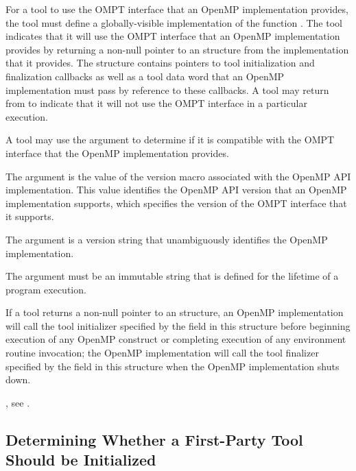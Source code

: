 \descr
For a tool to use the OMPT interface that an OpenMP implementation provides,
the tool must define a globally-visible implementation of the
function . The tool indicates that it will use the OMPT 
interface that an OpenMP implementation provides by returning a non-null 
pointer to an  structure from the 
 implementation that it provides. The 
 structure contains pointers to tool 
initialization and finalization callbacks as well as a tool data word 
that an OpenMP implementation must pass by reference to these callbacks. 
A tool may return  from  to indicate 
that it will not use the OMPT interface in a particular execution.

A tool may use the  argument to determine if it is 
compatible with the OMPT interface that the OpenMP implementation provides.

\argdesc
The argument  is the value of the  version macro
associated with the OpenMP API implementation. This value identifies the OpenMP 
API version that an OpenMP implementation supports, which specifies the version 
of the OMPT interface that it supports.

The argument  is a version string that unambiguously 
identifies the OpenMP implementation.

\constraints
The argument  must be an immutable string that is defined 
for the lifetime of a program execution.

\effect
If a tool returns a non-null pointer to an  
structure, an OpenMP implementation will call the tool initializer specified 
by the  field in this structure before beginning execution 
of any OpenMP construct or completing execution of any environment routine 
invocation; the OpenMP implementation will call the tool finalizer specified 
by the  field in this structure when the OpenMP implementation 
shuts down.

\begin{crossrefs}
\item {}, see
.
\end{crossrefs}





\subsection{Determining Whether a First-Party Tool Should be Initialized}
\label{sec:ompt-check-tool}

